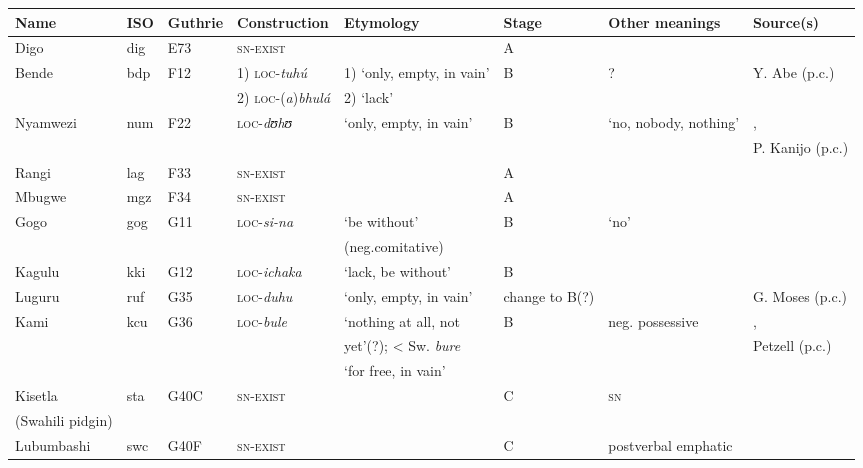 \documentclass[output=paper,draft,draftmode,colorlinks,citecolor=brown]{langscibook}
\begin{document}
\begin{paperappendix}
\begin{sidewaystable}
\scriptsize
\begin{tabularx}{\textwidth}{llllllQQ}
\lsptoprule
{Name}	&{ISO}	&{Guthrie}	&{Construction}&{Etymology}		&{Stage}	&{Other meanings}&{Source(s)}\\
\midrule
{Digo}		&{dig}		&{E73}	&\textsc{sn-exist}	&\textendash								&A{}	&\textendash										&\citet{Nicolle2013}\\
{Bende} 	&{bdp} 	&{F12} 	&1) \textsc{loc}-\textit{tuh\'u}&1) `only, empty, in vain'			&B{}	&?												&Y. Abe (p.c.)\\
				&				&				&2) \textsc{loc}-(\textit{a})\textit{bhul\'a}&2) `lack'\\
{Nyamwezi}&{num}	&{F22}	&\textsc{loc}-\textit{dʊhʊ}&‘only, empty, in vain'				&B{}	&`no, nobody, nothing'							&\citet{MagangaSchadeberg1992},\\
				&				&				&				&										&		&												&P. Kanijo (p.c.)\\
{Rangi} 	&{lag}		&{F33}	&\textsc{sn-exist}	&\textendash								&A{}	&												&\citet{Gibson2012,Dunham2005}\\
{Mbugwe} 	&{mgz} 	&{F34}	&\textsc{sn-exist}
&\textendash								&A 		&
&\citet{GibsonWilhelmsen2015}\\
{Gogo} 	&{gog} 	&{G11} 	&\textsc{loc}-\textit{si-na}&`be without'					&B{}	&`no'											&\citet{Cordell1941}\\
				&				&				&				&(neg.comitative)\\
{Kagulu} 	&{kki} 	&{G12} 	&\textsc{loc}-\textit{ichaka}&`lack, be without'				&B 		&												&\citet{Petzell2008}\\
{Luguru} 	&{ruf}		&{G35}	&\textsc{loc}-\textit{duhu}&`only, empty, in vain'				&change to B(?) 	&												&G. Moses (p.c.)\\
{Kami}	&{kcu}	&{G36}	&\textsc{loc}-\textit{bule}&`nothing at all, not				&B{}	&neg. possessive									&\citet{PetzellAunio2016},\\
				&				&				&				&yet'(?); < Sw. \textit{bure}				&		&												&Petzell (p.c.)\\
				&				&				&				&`for free, in vain'\\
{Kisetla}	&{sta} 	&{G40C}	&\textsc{sn-exist}&\textendash								&C 		&\textsc{sn}										&\citet{Vitale1980}\\
{(Swahili pidgin)}\\
{Lubumbashi}&{swc}	&{G40F} 	&\textsc{sn-exist}&\textendash								&C 		& postverbal emphatic								&\citet{Schicho1992}\\

\end{tabularx}
\end{sidewaystable}
\end{paperappendix}
\end{document}
